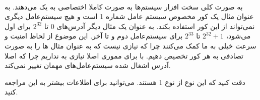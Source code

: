 \\
به صورت کلی سخت افزار سیستم‌ها به صورت کاملا اختصاصی به یک
می‌دهند. به عنوان مثال یک کور
مخصوص سیستم عامل شماره 1 است و هیچ سیستم‌عامل دیگری نمی‌تواند از این کور استفاده بکند.
به عنوان یک مثال دیگر آدرس‌های
$0$
تا
$2^32$
برای
اول می‌شود،
$2^32+1$
تا
$2^33$
برای سیستم‌عامل دوم و تا آخر.
این موضوع از لحاظ امنیت و سرعت خیلی به ما کمک می‌کنند چرا که نیازی نیست که به عنوان مثال
ها
را به صورت تصادفی به هر کور
تخصیص دهیم. با برای مموری اصلا نیازی به
نداریم چرا که اصلا آدرس اشغال شده سیستم‌عامل‌های مهمان تغییر نمی‌کند.

\noindent
دقت کنید که این نوع
از نوع 1 هستند.
می‌توانید برای اطلاعات بیشتر به این
مراجعه کنید.